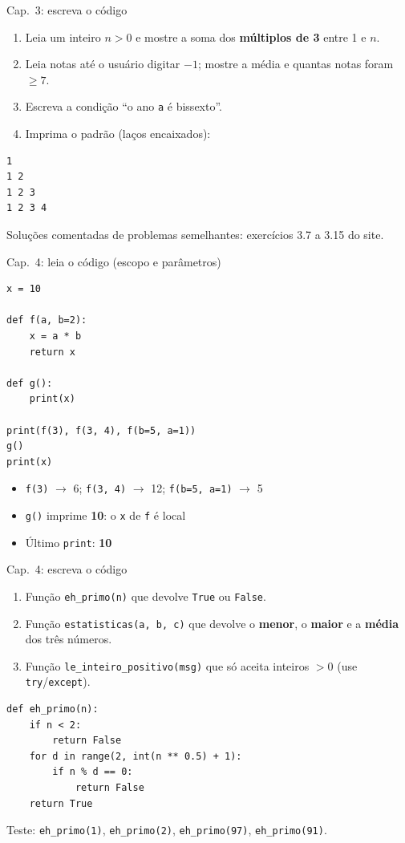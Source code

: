 \documentclass[aspectratio=169,10pt,t]{beamer}
\begin{document}
\begin{frame}[fragile]{Cap.~3: escreva o código}
  \begin{enumerate}
    \item Leia um inteiro \(n>0\) e mostre a soma dos \textbf{múltiplos de 3} entre 1 e \(n\).
    \item Leia notas até o usuário digitar \(-1\); mostre a média e quantas notas foram \(\ge 7\).
    \item Escreva a condição ``o ano \texttt{a} é bissexto''.
    \item Imprima o padrão (laços encaixados):
  \end{enumerate}
\begin{lstlisting}[style=saida]
1
1 2
1 2 3
1 2 3 4
\end{lstlisting}
  \small Soluções comentadas de problemas semelhantes: exercícios 3.7 a 3.15 do site.
\end{frame}

\begin{frame}[fragile]{Cap.~4: leia o código (escopo e parâmetros)}
\begin{lstlisting}
x = 10

def f(a, b=2):
    x = a * b
    return x

def g():
    print(x)

print(f(3), f(3, 4), f(b=5, a=1))
g()
print(x)
\end{lstlisting}
  \begin{itemize}
    \item \texttt{f(3)} \(\to\) 6; \texttt{f(3, 4)} \(\to\) 12; \texttt{f(b=5, a=1)} \(\to\) 5
    \item \texttt{g()} imprime \textbf{10}: o \texttt{x} de \texttt{f} é local
    \item Último \texttt{print}: \textbf{10}
  \end{itemize}
\end{frame}

\begin{frame}[fragile]{Cap.~4: escreva o código}
  \begin{enumerate}
    \item Função \texttt{eh\_primo(n)} que devolve \texttt{True} ou \texttt{False}.
    \item Função \texttt{estatisticas(a, b, c)} que devolve o \textbf{menor}, o \textbf{maior} e a \textbf{média} dos três números.
    \item Função \texttt{le\_inteiro\_positivo(msg)} que só aceita inteiros \(>0\) (use \texttt{try}/\texttt{except}).
  \end{enumerate}
  \vspace{1ex}
\begin{lstlisting}
def eh_primo(n):
    if n < 2:
        return False
    for d in range(2, int(n ** 0.5) + 1):
        if n % d == 0:
            return False
    return True
\end{lstlisting}
  \small Teste: \texttt{eh\_primo(1)}, \texttt{eh\_primo(2)}, \texttt{eh\_primo(97)}, \texttt{eh\_primo(91)}.
\end{frame}
\end{document}
